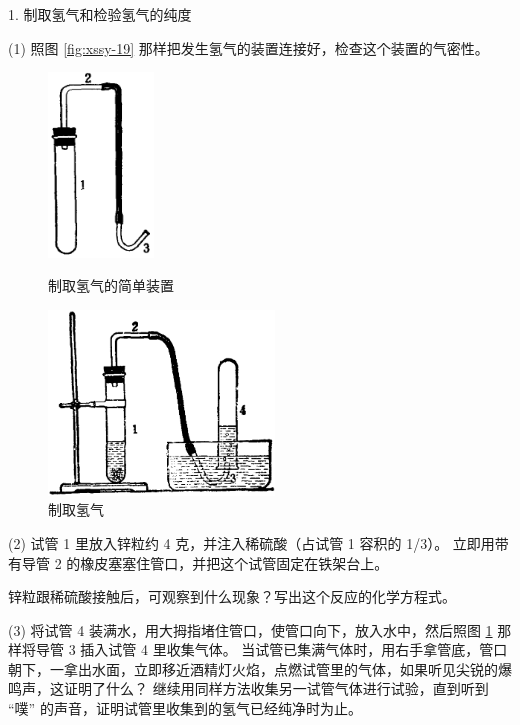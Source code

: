 \begin{shiyanbuzhou}
    1. 制取氢气和检验氢气的纯度

    (1) 照图 \ref{fig:xssy-19} 那样把发生氢气的装置连接好，检查这个装置的气密性。

    \begin{figure}[htbp]
        \centering
        \begin{minipage}[b]{7cm}
            \centering
            \includegraphics[width=2.8cm]{../pic/czhx1-xssy-19}
            \caption{制取氢气的简单装置}\label{fig:xssy-19}
        \end{minipage}
        \qquad
        \begin{minipage}[b]{7cm}
            \centering
            \includegraphics[width=6cm]{../pic/czhx1-xssy-20}
            \caption{制取氢气}\label{fig:xssy-20}
        \end{minipage}
    \end{figure}

    (2) 试管 1 里放入锌粒约 4 克，并注入稀硫酸（占试管 1 容积的 1/3）。
    立即用带有导管 2 的橡皮塞塞住管口，并把这个试管固定在铁架台上。

    锌粒跟稀硫酸接触后，可观察到什么现象？写出这个反应的化学方程式。

    (3) 将试管 4 装满水，用大拇指堵住管口，使管口向下，放入水中，然后照图 \ref{fig:xssy-20} 那样将导管 3 插入试管 4 里收集气体。
    当试管已集满气体时，用右手拿管底，管口朝下，一拿出水面，立即移近酒精灯火焰，点燃试管里的气体，如果听见尖锐的爆鸣声，这证明了什么？
    继续用同样方法收集另一试管气体进行试验，直到听到 “噗” 的声音，证明试管里收集到的氢气已经纯净时为止。


\end{shiyanbuzhou}
